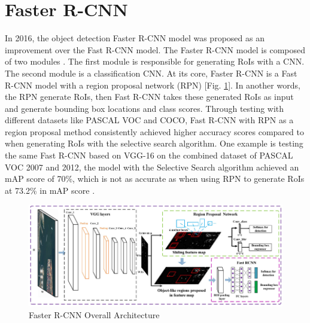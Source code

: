 \section{Faster R-CNN}  \label{sec:faster_rcnn}

In 2016, the object detection Faster R-CNN model was proposed as an improvement over the Fast R-CNN model. The Faster R-CNN model is composed of two modules . The first module is responsible for generating RoIs with a CNN. The second module is a classification CNN. At its core, Faster R-CNN is a Fast R-CNN model with a region proposal network (RPN) [Fig. \ref{fig:faster_rcnn_archite}]. In another words, the RPN generate RoIs, then Fast R-CNN takes these generated RoIs as input and generate bounding box locations and class scores. Through testing with different datasets like PASCAL VOC and COCO, Fast R-CNN with RPN as a region proposal method consistently achieved higher accuracy scores compared to when generating RoIs with the selective search algorithm. One example is testing the same Fast R-CNN based on VGG-16 on the combined dataset of PASCAL VOC 2007 and 2012, the model with the Selective Search algorithm achieved an mAP score of 70\%, which is not as accurate as when using RPN to generate RoIs at 73.2\% in mAP score \cite{faster_rcnn_2015}.

\begin{figure}[!ht]
    \centering
    \includegraphics[width=5in]{figures/faster_rcnn_archite.png}
    \caption{Faster R-CNN Overall Architecture \cite{faster_rcnn_architecture_fig}} \label{fig:faster_rcnn_archite}
\end{figure}

